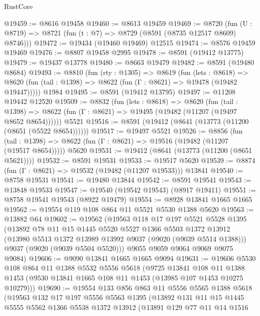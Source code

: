 \begin{lexlean}{RustCore}
\begin{coremodule}
@19459 := @8616 @19458
@19460 := @8613 @19459
@19469 := @8720
    (fun (U : @8719) => @8721 (fun (t : @7) => @8729 (@8591 (@8735 @12517 @8609) @8746)))
@19472 := @19434 (@19460 @19469) @12515
@19474 := @8576 @19459 @19469
@19476 := @8807 @19458 @2995
@19478 := @8591 (@19412 @13775)
@19479 := @19437 @13778
@19480 := @8663 @19479
@19482 := @8591 (@19480 @8684)
@19493 := @8810
    (fun (rty : @1305) =>
    @8619
      (fun (lets : @8618) =>
      @8620 (fun (tail : @1398) => @8622 (fun (Γ : @8621) => @19478 (@19482 @19447)))))
    @1984
@19495 := @8591 (@19412 @13795)
@19497 := @11208 @19442 @12520
@19509 := @8832
    (fun (lets : @8618) =>
    @8620
      (fun (tail : @1398) =>
      @8622 (fun (Γ : @8621) => @19495 (@19482 (@11207 (@19497 @8652 @8654))))))
    @5521
@19516 := @8591 (@19412 (@8641 (@13773 (@11200 (@8651 (@5522 @8654))))))
@19517 := @19497 @5521
@19526 := @8856
    (fun (tail : @1398) => @8622 (fun (Γ : @8621) => @19516 (@19482 (@11207 (@19517 @8654)))))
    @5620
@19531 := @19412 (@8641 (@13773 (@11200 (@8651 @5621))))
@19532 := @8591 @19531
@19533 := @19517 @5620
@19539 := @8874 (fun (Γ : @8621) => @19532 (@19482 (@11207 @19533))) @13841
@19540 := @8758 @19531
@19541 := @19480 @13844
@19542 := @8591 @19541
@19543 := @13848 @19533
@19547 := @19540 (@19542 @19543) (@8917 @19411)
@19551 := @8758 @19541 @19543 (@8922 @19479)
@19554 := @8928 @13841 @1665 @1665
@19562 := @19554 @119 @108 @864 @11 @5521 @5530 @1388 @5620
@19563 := @13882 @64
@19602 := @19562
    (@19563
      @118
      @17
      @197
      @5521
      @5528
      @1395
      (@13892
        @78
        @11
        @15
        @1445
        @5520
        @5527
        @1366
        @5503
        @1372
        @13912
        (@13980 @5513 @1372 @13989 @13992 @9037 (@9020 (@9039 @5514 @1388)))
        @9037
        (@9020 (@9039 @5504 @5520)))
      @9055
      @9059
      @9064
      @9069
      @9075
      @9084)
@19606 := @9090 @13841 @1665 @1665 @9094
@19631 := @19606
    @5530
    @108
    @864
    @11
    @1388
    @5532
    @5556
    @5618
    (@9725
      @13841
      @108
      @11
      @1388
      @1453
      (@9530 @13841 @1665 @108 @11 @1453 (@13985 @107 @1453 @10275 @10279)))
@19690 := @19554
    @133
    @856
    @863
    @11
    @5556
    @5565
    @1388
    @5618
    (@19563
      @132
      @17
      @197
      @5556
      @5563
      @1395
      (@13892
        @131
        @11
        @15
        @1445
        @5555
        @5562
        @1366
        @5538
        @1372
        @13912
        (@13891
          @129
          @77
          @11
          @14
          @1516

\end{coremodule}
\end{lexlean}
